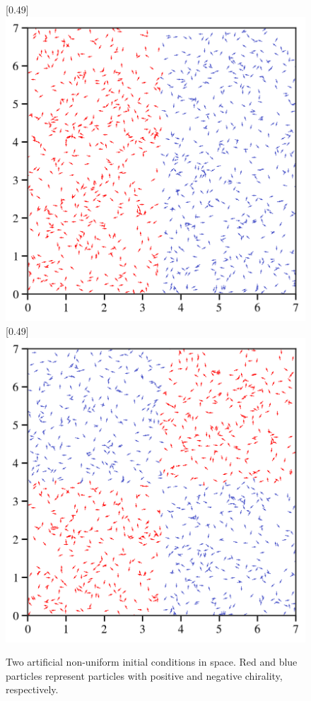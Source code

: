 \documentclass{article}
\begin{document}
\begin{figure}[H]
    \centering
    [0.49\linewidth]{
      \includegraphics[width=\linewidth]{figs/halfSide.png}
    }
    \hfill
    [0.49\linewidth]{
      \includegraphics[width=\linewidth]{figs/chess.png}
    }
    \caption{
        Two artificial non-uniform initial conditions in space. Red and blue particles represent particles with positive and negative chirality, respectively. 
    }
\end{figure}
\end{document}
